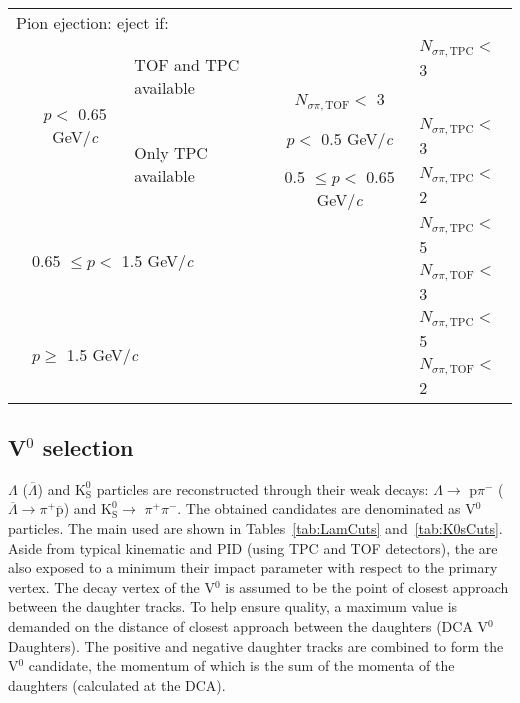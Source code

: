 \documentclass[ALICE,manyauthors]{cernphprep}
\newcommand{\Lam}{$\Lambda$\xspace}
\newcommand{\ALam}{$\overline{\Lambda}$\xspace}
\newcommand{\LamALam}{$\Lambda$ ($\overline{\Lambda}$)\xspace}
\newcommand{\Kpm}{$\mathrm{K^{\pm}}$\xspace}
\newcommand{\Ks}{$\mathrm{K^{0}_{S}}$\xspace}
\newcommand{\Vz}{V$^{0}$\xspace}
\begin{document}
\begin{table}[htbp]
\begin{tabular}{lcc|c|l}
   \multicolumn{5}{l}{Pion {\color{red}{R}}{\color{blue}{r}}ejection:  {\color{red}{R}}{\color{blue}{r}}eject if:} \\
   \cline{2-5}
   \multirow{4}{*}{} & \multirow{4}{*}{$p <$ 0.65 GeV/\textit{c}} & \multicolumn{1}{l}{\multirow{2}{*}{TOF and TPC available}} & \multicolumn{1}{c|}{} & $N_{\sigma \pi,\mathrm{TPC}} <$ 3 \\
   \multicolumn{4}{c|}{} & $N_{\sigma \pi,\mathrm{TOF}} <$ 3 \\
   \cline{3-5}
   \multicolumn{2}{c}{} & \multicolumn{1}{l|}{\multirow{2}{*}{Only TPC available}} & $p <$ 0.5 GeV/\textit{c} & $N_{\sigma \pi,\mathrm{TPC}} <$ 3 \\
   \cline{4-5}
   \multicolumn{3}{c|}{} & 0.5 $\leq p <$ 0.65 GeV/\textit{c} & $N_{\sigma \pi,\mathrm{TPC}} <$ 2 \\
   \cline{2-5}
    & \multicolumn{3}{l|}{\multirow{2}{*}{0.65 $\leq p <$ 1.5 GeV/\textit{c}}} & $N_{\sigma \pi,\mathrm{TPC}} <$ 5 \\
    \multicolumn{4}{c|}{} & $N_{\sigma \pi,\mathrm{TOF}} <$ 3 \\
   \cline{2-5}
    & \multicolumn{3}{l|}{\multirow{2}{*}{$p \geq$ 1.5 GeV/\textit{c}}} & $N_{\sigma \pi,\mathrm{TPC}} <$ 5 \\
    \multicolumn{4}{c|}{} & $N_{\sigma \pi,\mathrm{TOF}} <$ 2 \\
   \hline
  \end{tabular}
 \caption{{\color{red}{\Kpm selection}}}
 \label{tab:KchCuts} 
\end{table}


\subsection{\Vz selection}
\label{sec:V0Selection}

{\color{blue}{Electrically neutral}} \LamALam and \Ks particles are reconstructed through their weak decays: \Lam $\rightarrow$ p$\pi^{-}$ (\ALam $\rightarrow \pi^{+}\overline{\mathrm{p}}$) and \Ks $\rightarrow$ $\pi^{+}\pi^{-}$.
The obtained candidates are denominated as \Vz particles.
The main {\color{red}{cuts}} {\color{blue}{selection criteria}} used are shown in Tables~\ref{tab:LamCuts} and~\ref{tab:K0sCuts}.
Aside from typical kinematic and PID {\color{red}{cuts}} {\color{blue}{selection methods}} (using TPC and TOF detectors), the {\color{red}{daughter tracks}} {} are also exposed to a minimum {\color{red}{cut on}} {\color{blue}{requirement of}} their impact parameter with respect to the primary vertex.  
The decay vertex of the \Vz is assumed to be the point of closest approach between the daughter tracks.
To help ensure quality, a maximum value {\color{red}{cut}} is demanded on the distance of closest approach between the daughters (DCA \Vz Daughters).
The positive and negative daughter tracks are combined to form the \Vz candidate, the momentum of which is {\color{red}{simply}} the sum of the momenta of the daughters (calculated at the DCA).
\end{document}
